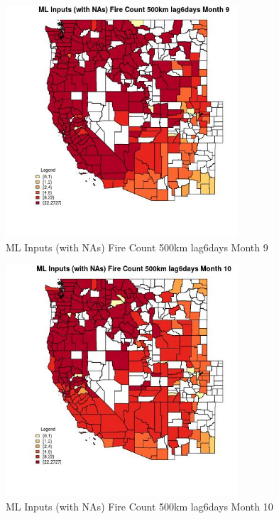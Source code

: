 \begin{figure} 
\centering  
\includegraphics[width=0.77\textwidth]{Code_Outputs/Report_ML_input_PM25_Step4_part_f_de_duplicated_aves_prioritize_24hr_obswNAs_CountyFire_Count_500km_lag6daysmedianMonth9.jpg} 
\caption{\label{fig:Report_ML_input_PM25_Step4_part_f_de_duplicated_aves_prioritize_24hr_obswNAsCountyFire_Count_500km_lag6daysmedianMonth9}ML Inputs (with NAs) Fire Count 500km lag6days Month 9} 
\end{figure} 
 

\begin{figure} 
\centering  
\includegraphics[width=0.77\textwidth]{Code_Outputs/Report_ML_input_PM25_Step4_part_f_de_duplicated_aves_prioritize_24hr_obswNAs_CountyFire_Count_500km_lag6daysmedianMonth10.jpg} 
\caption{\label{fig:Report_ML_input_PM25_Step4_part_f_de_duplicated_aves_prioritize_24hr_obswNAsCountyFire_Count_500km_lag6daysmedianMonth10}ML Inputs (with NAs) Fire Count 500km lag6days Month 10} 
\end{figure} 
 

